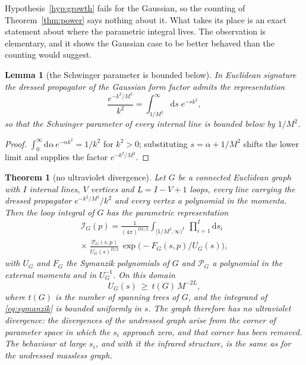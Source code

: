 \documentclass[aps,prd,10pt,twocolumn,superscriptaddress,nofootinbib,floatfix,longbibliography,showpacs,showkeys]{revtex4-2}
\theoremstyle{plain}
\newtheorem{theorem}{Theorem}
\newtheorem{lemma}{Lemma}
\theoremstyle{definition}
\theoremstyle{remark}
\newcommand{\dd}{\mathrm{d}}
\begin{document}
Hypothesis~\ref{hyp:growth} fails for the Gaussian, so the counting of Theorem~\ref{thm:power} says nothing about it. What takes its place is an exact statement about where the parametric integral lives. The observation is elementary, and it shows the Gaussian case to be better behaved than the counting would suggest.

\begin{lemma}[the Schwinger parameter is bounded below]
\label{lem:schwinger}
In Euclidean signature the dressed propagator of the Gaussian form factor admits the representation
\begin{equation}
\label{eq:schwinger}
\frac{e^{-k^2/M^2}}{k^2}=\int_{1/M^2}^{\infty}\dd s\;e^{-sk^2},
\end{equation}
so that the Schwinger parameter of every internal line is bounded below by $1/M^2$.
\end{lemma}

\begin{proof}
$\int_0^\infty\dd\alpha\,e^{-\alpha k^2}=1/k^2$ for $k^2>0$; substituting $s=\alpha+1/M^2$ shifts the lower limit and supplies the factor $e^{-k^2/M^2}$.
\end{proof}

\begin{theorem}[no ultraviolet divergence]
\label{thm:noUV}
Let $G$ be a connected Euclidean graph with $I$ internal lines, $V$ vertices and $L=I-V+1$ loops, every line carrying the dressed propagator $e^{-k^2/M^2}/k^2$ and every vertex a polynomial in the momenta. Then the loop integral of $G$ has the parametric representation
\begin{multline}
\label{eq:symanzik}
\mathcal I_G(p)=\frac{1}{(4\pi)^{DL/2}}\int_{[1/M^2,\infty)^I}\ \prod_{i=1}^{I}\dd s_i\\
\times\;\frac{\mathcal P_G(s,p)}{U_G(s)^{D/2}}\,
\exp\bigl(-F_G(s,p)/U_G(s)\bigr),
\end{multline}
with $U_G$ and $F_G$ the Symanzik polynomials of $G$ and $\mathcal P_G$ a polynomial in the external momenta and in $U_G^{-1}$. On this domain
\begin{equation}
\label{eq:Ubound}
U_G(s)\ \ge\ t(G)\,M^{-2L},
\end{equation}
where $t(G)$ is the number of spanning trees of $G$, and the integrand of \eqref{eq:symanzik} is bounded uniformly in $s$. The graph therefore has no ultraviolet divergence: the divergences of the undressed graph arise from the corner of parameter space in which the $s_i$ approach zero, and that corner has been removed. The behaviour at large $s_i$, and with it the infrared structure, is the same as for the undressed massless graph.
\end{theorem}
\end{document}
